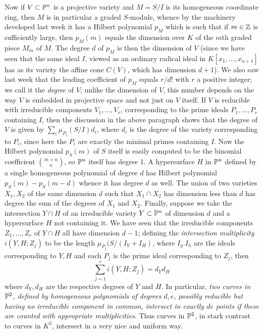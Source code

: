 Now if $V\subset\Bbb P^n$ is a projective variety and $M=S/I$ is its homogeneous coordinate ring, then $M$ is in particular a graded $S$-module, whence by the machinery developed last week it has a Hilbert polynomial $p_M$ which is such that if $m\in\Bbb Z$ is sufficiently large, then $p_M(m)$ equals the dimension over $K$ of the $m$th graded piece $M_m$ of $M$.  The degree $d$ of $p_M$ is then the dimension of $V$ (since we have seen that the same ideal $I$, viewed as an ordinary radical ideal in $K[x_1,\ldots,x_{n+1}]$ has as its variety the affine cone $C(V)$, which has dimension
$d+1$).  We also saw last week that the leading coefficient of $p_M$ equals $r/d!$ with $r$ a positive integer; we call it the {\sl degree} of $V$; unlike the dimension of $V$, this number depends on the way $V$ is embedded in projective space and not just on $V$ itself.  If $V$ is reducible with irreducible components $V_1,\ldots,V_r$, corresponding to the prime ideals $P_1,\ldots,P_r$ containing $I$, then the discussion in the above paragraph shows that the degree of $V$ is given by
 $\sum_i \mu_{P_i}(S/I) d_i$, where $d_i$ is the degree of the variety corresponding to $P_i$, since here the $P_i$ are exactly the minimal primes containing $I$.  Now the Hilbert polynomial $p_S(m)$ of $S$ itself is easily computed to be the binomial coefficient  $m+n\choose n$, so $\Bbb P^n$ itself has degree 1.  A hypersurface $H$ in $\Bbb P^n$ defined by a single homogeneous polynomial of degree $d$ has Hilbert polynomial $p_S(m) - p_S(m-d)$ whence it has degree $d$ as well.  The union of two varieties $X_1,X_2$ of the same dimension $d$ such that $X_1\cap X_2$ has dimension less than $d$ has degree the sum of the degrees of $X_1$ and $X_2$.  Finally, suppose we take the intersection $Y\cap H$ of an irreducible variety $Y\subset\Bbb P^n$ of dimension $d$ and a hypersurface $H$ not containing it.  We have seen that the irreducible components $Z_1,\ldots,Z_r$ of $Y\cap H$ all have dimension $d-1$; defining the {\sl intersection multiplicity} $i(Y,H;Z_j)$ to be the length $\mu_{P_j}(S/(I_Y + I_H)$, where $I_y.I_h$ are the ideals corresponding to $Y,H$ and each $P_j$ is the prime ideal corresponding to $Z_j$, then 
 $$
 \sum_{j=1}^r i(Y,H;Z_j) = d_Y d_H
 $$
 \noindent where $d_Y,d_H$ are the respective degrees of $Y$ and $H$.  In particular, {\sl two curves in $\Bbb P^2$, defined by homogeneous polynomials of degrees $d,e$, possibly reducible but having no irreducible component in common, intersect in exactly $de$ points if these are counted with appropriate multiplicities}.   Thus curves in $\Bbb P^2$, in stark contrast to curves in $K^2$, intersect in a very nice and uniform way.